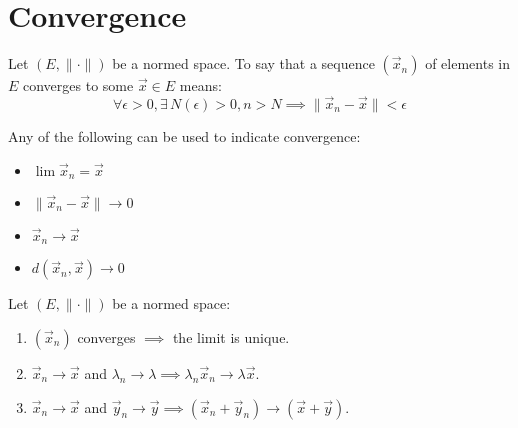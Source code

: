 \documentclass[letterpaper,12pt,fleqn]{article}
\newcommand{\e}{\epsilon}
\renewcommand{\l}{\lambda}
\newcommand{\norm}[1]{\|#1\|}
\newcommand{\vx}{\vec{x}}
\newcommand{\vy}{\vec{y}}
\begin{document}
\section*{Convergence}

\begin{definition}[Convergence]
  Let $(E,\norm{\cdot})$ be a normed space. To say that a sequence $(\vx_n)$ of
  elements in $E$ converges to some $\vx\in E$ means:
  \[\forall\e>0,\exists\,N(\e)>0,n>N\implies\norm{\vx_n-\vx}<\e\]
\end{definition}

\begin{notation}
  Any of the following can be used to indicate convergence:
  \begin{itemize}
  \item $\lim{\vx_n}=\vx$
  \item $\norm{\vx_n-\vx}\to0$
  \item $\vx_n\to\vx$
  \item $d(\vx_n,\vx)\to0$
  \end{itemize}
\end{notation}

\begin{theorem}[Properties]
  Let $(E,\norm{\cdot})$ be a normed space:
  \begin{enumerate}
  \item $(\vx_n)$ converges $\implies$ the limit is unique.
  \item $\vx_n\to\vx$ and $\l_n\to\l\implies\l_n\vx_n\to\l\vx$.
  \item $\vx_n\to\vx$ and $\vy_n\to\vy\implies(\vx_n+\vy_n)\to(\vx+\vy)$.
  \end{enumerate}
\end{theorem}
\end{document}
